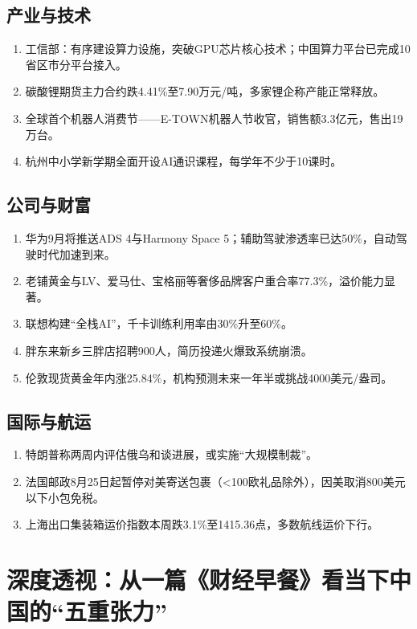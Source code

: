 \subsection{产业与技术}
\begin{enumerate}[leftmargin=*, nosep]
    \item 工信部：有序建设算力设施，突破GPU芯片核心技术；中国算力平台已完成10省区市分平台接入。
    \item 碳酸锂期货主力合约跌4.41\%至7.90万元/吨，多家锂企称产能正常释放。
    \item 全球首个机器人消费节——E-TOWN机器人节收官，销售额3.3亿元，售出19万台。
    \item 杭州中小学新学期全面开设AI通识课程，每学年不少于10课时。
\end{enumerate}

\subsection{公司与财富}
\begin{enumerate}[leftmargin=*, nosep]
    \item 华为9月将推送ADS 4与Harmony Space 5；辅助驾驶渗透率已达50\%，自动驾驶时代加速到来。
    \item 老铺黄金与LV、爱马仕、宝格丽等奢侈品牌客户重合率77.3\%，溢价能力显著。
    \item 联想构建“全栈AI”，千卡训练利用率由30\%升至60\%。
    \item 胖东来新乡三胖店招聘900人，简历投递火爆致系统崩溃。
    \item 伦敦现货黄金年内涨25.84\%，机构预测未来一年半或挑战4000美元/盎司。
\end{enumerate}

\subsection{国际与航运}
\begin{enumerate}[leftmargin=*, nosep]
    \item 特朗普称两周内评估俄乌和谈进展，或实施“大规模制裁”。
    \item 法国邮政8月25日起暂停对美寄送包裹（<100欧礼品除外），因美取消800美元以下小包免税。
    \item 上海出口集装箱运价指数本周跌3.1\%至1415.36点，多数航线运价下行。
\end{enumerate}




\section{深度透视：从一篇《财经早餐》看当下中国的“五重张力”}

